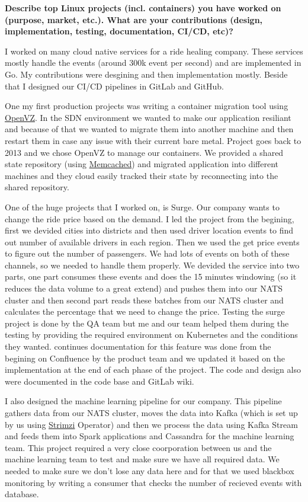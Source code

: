 \noindent
\textbf{Describe top Linux projects (incl. containers) you have worked on (purpose, market, etc.).
What are your contributions (design, implementation, testing, documentation, CI/CD, etc)?}

I worked on many cloud native services for a ride healing company. These services mostly handle the events (around
300k event per second) and are implemented in Go. My contributions were desgining and then implementation mostly.
Beside that I designed our CI/CD pipelines in GitLab and GitHub.

One my first production projects was writing a container migration tool using \href{https://openvz.org/}{OpenVZ}.
In the SDN environment we wanted to make our application resiliant and because of that we wanted to migrate them into
another machine and then restart them in case any issue with their current bare metal.
Project goes back to 2013 and we chose OpenVZ to manage our containers. We provided a shared state repository (using \href{https://memcached.org/}{Memcached})
and migrated application into different machines and they cloud easily tracked their state by reconnecting into the shared
repository.

One of the huge projects that I worked on, is Surge. Our company wants to change the ride price based on the demand.
I led the project from the begining, first we devided cities into districts and then used driver location events to find
out number of available drivers in each region. Then we used the get price events to figure out the number of passengers.
We had lots of events on both of these channels, so we needed to handle them properly. We devided the service into two parts,
one part consumes these events and does the 15 minutes windowing (so it reduces the data volume to a great extend) and
pushes them into our NATS cluster and then second part reads these batches from our NATS cluster and calculates
the percentage that we need to change the price.
Testing the surge project is done by the QA team but me and our team helped them during the testing by providing
the required environment on Kubernetes and the conditions they wanted.
continues documentation for this feature was done from the begining on Confluence by the product team and we updated it
based on the implementation at the end of each phase of the project.
The code and design also were documented in the code base and GitLab wiki.

I also designed the machine learning pipeline for our company. This pipeline gathers data from our NATS cluster,
moves the data into Kafka (which is set up by us using \href{https://strimzi.io/}{Strimzi} Operator)
and then we process the data using Kafka Stream and feeds them into Spark applications and Cassandra for the machine learning
team. This project required a very close coorporation between us and the machine learning team to test and make
sure we have all required data. We needed to make sure we don't lose any data here and for that we used blackbox monitoring
by writing a consumer that checks the number of recieved events with database.


